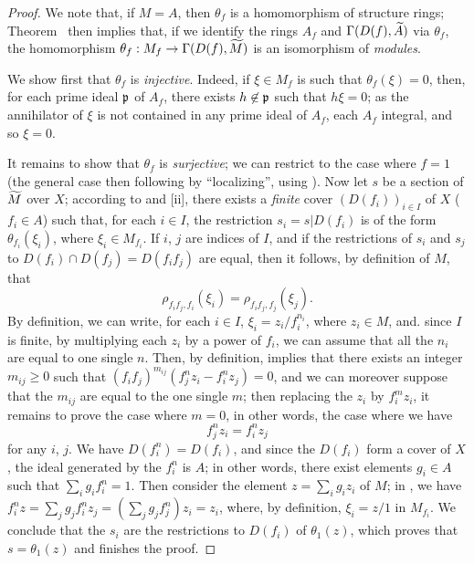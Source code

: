 \begin{proof}
\label{proof-1.1.3.7}
We note that, if $M=A$, then $\theta_f$ is a homomorphism of structure rings;
Theorem~ then implies that, if we identify the rings $A_f$ and $\Gamma(D(f),{\widetilde{A}})$ via $\theta_f$, the homomorphism $\theta_f:M_f\to\Gamma(D(f),\wt{M})$ is an isomorphism of \emph{modules}.

We show first that $\theta_f$ is \emph{injective}.
Indeed, if $\xi\in M_f$ is such that $\theta_f(\xi)=0$, then, for each prime ideal $\mathfrak{p}$ of $A_f$, there exists $h\not\in\mathfrak{p}$ such that $h\xi=0$;
as the annihilator of $\xi$ is not contained in any prime ideal of $A_f$, each $A_f$ integral, and so $\xi=0$.

It remains to show that $\theta_f$ is \emph{surjective};
we can restrict to the case where $f=1$ (the general case then following by ``localizing'', using ).
Now let $s$ be a section of ${\widetilde{M}}$ over $X$;
according to  and [ii], there exists a \emph{finite} cover $(D(f_i))_{i\in I}$ of $X$ ($f_i\in A$) such that, for each $i\in I$, the restriction $s_i=s|D(f_i)$ is of the form $\theta_{f_i}(\xi_i)$, where $\xi_i\in M_{f_i}$.
If $i$, $j$ are indices of $I$, and if the restrictions of $s_i$ and $s_j$ to $D(f_i)\cap D(f_j)=D(f_i f_j)$ are equal, then it follows, by definition of $M$, that
\begin{equation*}
  \label{1.1.3.7.1}
  \rho_{f_i f_j,f_i}(\xi_i)=\rho_{f_i f_j,f_j}(\xi_j).
  \tag{1.3.7.1}
\end{equation*}
By definition, we can write, for each $i\in I$, $\xi_i=z_i/f_i^{n_i}$, where $z_i\in M$, and. since $I$ is finite, by multiplying each $z_i$ by a power of $f_i$, we can assume that all the $n_i$ are equal to one single $n$.
Then, by definition,  implies that there exists an integer $m_{ij}\geqslant 0$ such that $(f_i f_j)^{m_{ij}}(f_j^n z_i-f_i^n z_j)=0$, and we can moreover suppose that the $m_{ij}$ are equal to the one single $m$;
then replacing the $z_i$ by $f_i^m z_i$, it remains to prove the case where $m=0$, in other words, the case where we have
\begin{equation*}
  \label{1.1.3.7.2}
  f_j^n z_i=f_i^n z_j
  \tag{1.3.7.2}
\end{equation*}
for any $i$, $j$.
We have $D(f_i^n)=D(f_i)$, and since the $D(f_i)$ form a cover of $X$, the ideal generated by the $f_i^n$ is $A$;
in other words, there exist elements $g_i\in A$ such that $\sum_i g_i f_i^n=1$.
Then consider the element $z=\sum_i g_i z_i$ of $M$;
in , we have $f_i^n z=\sum_j g_j f_i^n z_j=(\sum_j g_j f_j^n)z_i=z_i$, where, by definition, $\xi_i=z/1$ in $M_{f_i}$.
We conclude
that the $s_i$ are the restrictions to $D(f_i)$ of $\theta_1(z)$, which proves that $s=\theta_1(z)$ and finishes the proof.
\end{proof}

